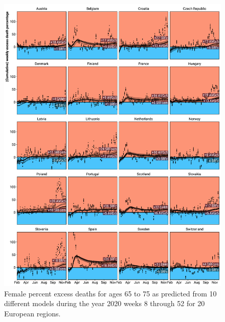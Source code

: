 \documentclass[12pt]{article}
\begin{document}
\begin{appendix}
\begin{figure}
\caption{
Female percent excess deaths for ages 65 to 75 as predicted from 10 different models during the year 2020 weeks 8 through 52 for 20 European regions.}
\label{fig:excessf65to75}
\includegraphics{excess_female__65_75_.pdf}
\end{figure}


\end{appendix}
\end{document}
